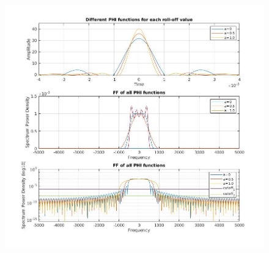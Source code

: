 \documentclass[12pt, a4paper]{article}
\begin{document}
\begin{figure}[H]
\centering
\noindent\includegraphics[width=\textwidth]{phi_ffts.jpg}
\end{figure}
\end{document}
